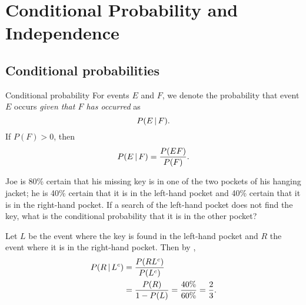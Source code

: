 \section{Conditional Probability and Independence}
\subsection{Conditional probabilities}
\begin{bdef}{Conditional probability}\label{conpro}
    For events $E$ and $F$, we denote the probability that event $E$ occurs \emph{given that $F$ has occurred} as \[
        P(E \,\vert\, F).    
    \] If $P(F) > 0$, then \[
        P(E \,\vert\, F) = \frac{P(EF)}{P(F)}.    
    \]
\end{bdef}
\begin{changebar}
\begin{example}
    Joe is 80\% certain that his missing key is in one of the two pockets of his hanging jacket; he is 40\% certain that it is in the left-hand pocket and 40\% certain that it is in the right-hand pocket. If a search of the left-hand pocket does not find the key, what is the conditional probability that it is in the other pocket?
\end{example}
\begin{solution}
    Let $L$ be the event where the key is found in the left-hand pocket and $R$ the event where it is in the right-hand pocket. Then by , \[
        \begin{aligned}
            P(R \,\vert\, L^c) &= \frac{P(RL^c)}{P(L^c)} \\
            &= \frac{P(R)}{1-P(L)} = \frac{40\%}{60\%} = \frac{2}{3}.
        \end{aligned}
    \]
\end{solution}
\end{changebar}

